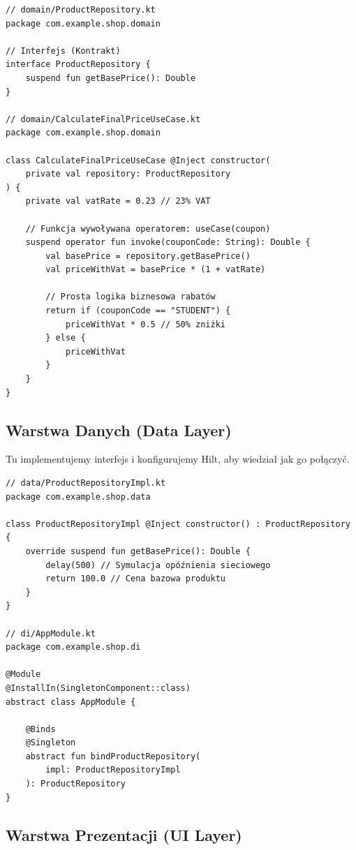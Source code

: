 \begin{verbatim}
// domain/ProductRepository.kt
package com.example.shop.domain

// Interfejs (Kontrakt)
interface ProductRepository {
    suspend fun getBasePrice(): Double
}

// domain/CalculateFinalPriceUseCase.kt
package com.example.shop.domain

class CalculateFinalPriceUseCase @Inject constructor(
    private val repository: ProductRepository
) {
    private val vatRate = 0.23 // 23% VAT

    // Funkcja wywoływana operatorem: useCase(coupon)
    suspend operator fun invoke(couponCode: String): Double {
        val basePrice = repository.getBasePrice()
        val priceWithVat = basePrice * (1 + vatRate)

        // Prosta logika biznesowa rabatów
        return if (couponCode == "STUDENT") {
            priceWithVat * 0.5 // 50% zniżki
        } else {
            priceWithVat
        }
    }
}
\end{verbatim}

\subsection{Warstwa Danych (Data Layer)}

Tu implementujemy interfejs i konfigurujemy Hilt, aby wiedział jak go połączyć.

\begin{verbatim}
// data/ProductRepositoryImpl.kt
package com.example.shop.data

class ProductRepositoryImpl @Inject constructor() : ProductRepository {
    override suspend fun getBasePrice(): Double {
        delay(500) // Symulacja opóźnienia sieciowego
        return 100.0 // Cena bazowa produktu
    }
}

// di/AppModule.kt
package com.example.shop.di

@Module
@InstallIn(SingletonComponent::class)
abstract class AppModule {

    @Binds
    @Singleton
    abstract fun bindProductRepository(
        impl: ProductRepositoryImpl
    ): ProductRepository
}
\end{verbatim}

\subsection{Warstwa Prezentacji (UI Layer)}

